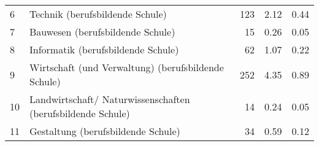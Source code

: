 \begin{longtable}{lXrrr}
     6 &
     \multicolumn{1}{X}{ Technik (berufsbildende Schule)   } &


       \num{123} &
       \num[round-mode=places,round-precision=2]{2,12} &
         \num[round-mode=places,round-precision=2]{0,44} \\

     7 &
     \multicolumn{1}{X}{ Bauwesen (berufsbildende Schule)   } &


       \num{15} &
       \num[round-mode=places,round-precision=2]{0,26} &
         \num[round-mode=places,round-precision=2]{0,05} \\

     8 &
     \multicolumn{1}{X}{ Informatik (berufsbildende Schule)   } &


       \num{62} &
       \num[round-mode=places,round-precision=2]{1,07} &
         \num[round-mode=places,round-precision=2]{0,22} \\

     9 &
     \multicolumn{1}{X}{ Wirtschaft (und Verwaltung) (berufsbildende Schule)   } &


       \num{252} &
       \num[round-mode=places,round-precision=2]{4,35} &
         \num[round-mode=places,round-precision=2]{0,89} \\

     10 &
     \multicolumn{1}{X}{ Landwirtschaft/ Naturwissenschaften (berufsbildende Schule)   } &


       \num{14} &
       \num[round-mode=places,round-precision=2]{0,24} &
         \num[round-mode=places,round-precision=2]{0,05} \\

     11 &
     \multicolumn{1}{X}{ Gestaltung (berufsbildende Schule)   } &


       \num{34} &
       \num[round-mode=places,round-precision=2]{0,59} &
         \num[round-mode=places,round-precision=2]{0,12} \\


\end{longtable}
